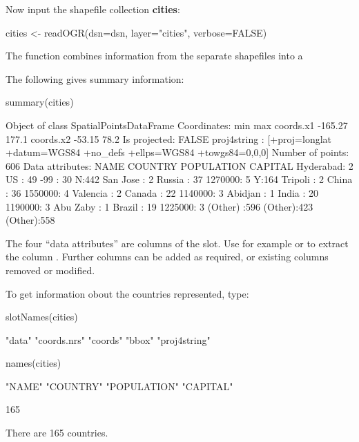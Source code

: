 {Now input the shapefile collection {\bf cities}:
\begin{Schunk}
\begin{Sinput}
cities <- readOGR(dsn=dsn, layer="cities", verbose=FALSE)
\end{Sinput}
\end{Schunk}
\noindent
The  function combines information from the separate
shapefiles into a 

The following gives summary information:
\begin{Schunk}
\begin{Sinput}
summary(cities)
\end{Sinput}
\begin{Soutput}
Object of class SpatialPointsDataFrame
Coordinates:
              min   max
coords.x1 -165.27 177.1
coords.x2  -53.15  78.2
Is projected: FALSE 
proj4string :
[+proj=longlat +datum=WGS84 +no_defs +ellps=WGS84 +towgs84=0,0,0]
Number of points: 606
Data attributes:
        NAME        COUNTRY      POPULATION  CAPITAL
 Hyderabad:  2   US     : 49   -99    : 30   N:442  
 San Jose :  2   Russia : 37   1270000:  5   Y:164  
 Tripoli  :  2   China  : 36   1550000:  4          
 Valencia :  2   Canada : 22   1140000:  3          
 Abidjan  :  1   India  : 20   1190000:  3          
 Abu Zaby :  1   Brazil : 19   1225000:  3          
 (Other)  :596   (Other):423   (Other):558          
\end{Soutput}
\end{Schunk}
\noindent
The four ``data attributes'' are columns of the  slot.  Use
for example  or  to
extract the column .    Further
columns can be added as required, or existing columns removed or
modified.

To get information obout the countries represented, type:
\begin{Schunk}
\begin{Sinput}
slotNames(cities)
\end{Sinput}
\begin{Soutput}
[1] "data"        "coords.nrs"  "coords"      "bbox"        "proj4string"
\end{Soutput}
\begin{Sinput}
names(cities)
\end{Sinput}
\begin{Soutput}
[1] "NAME"       "COUNTRY"    "POPULATION" "CAPITAL"   
\end{Soutput}
\begin{Soutput}
[1] 165
\end{Soutput}
\end{Schunk}
\noindent
There are 165 countries.

}
